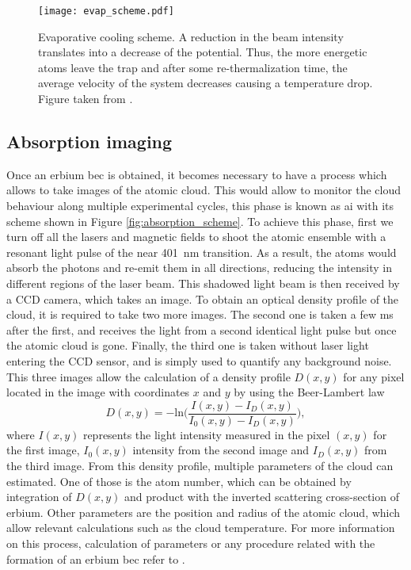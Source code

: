 \begin{figure}[!htbp]\centering
	\texttt{[image: evap\_scheme.pdf]}
	\caption[Evaporative cooling scheme]{Evaporative cooling scheme. A reduction in the beam intensity translates into a decrease of the potential. Thus, the more energetic atoms leave the trap and after some re-thermalization time, the average velocity of the system decreases causing a temperature drop. Figure taken from \cite{Rehberger2013}. }\label{fig:evaporative_cooling}
\end{figure}


\subsection{Absorption imaging}

Once an erbium \ac{bec} is obtained, it becomes necessary to have a process which allows to take images of the atomic cloud. This would allow to monitor the cloud behaviour along multiple experimental cycles, this phase is known as \Acf{ai} with its scheme shown in Figure \ref{fig:absorption_scheme}. To achieve this phase, first we turn off all the lasers and magnetic fields to shoot the atomic ensemble with a resonant light pulse of the near \SI{401}{\nano\meter} transition. As a result, the atoms would absorb the photons and re-emit them in all directions, reducing the intensity in different regions of the laser beam. This shadowed light beam is then received by a CCD camera, which takes an image. To obtain an optical density profile of the cloud, it is required to take two more images. The second one is taken a few \si{\milli\second} after the first, and receives the light from a second identical light pulse but once the atomic cloud is gone. Finally, the third one is taken without laser light entering the CCD sensor, and is simply used to quantify any background noise. This three images allow the calculation of a density profile $D(x,y)$ for any pixel located in the image with coordinates $x$ and $y$ by using the Beer-Lambert law \cite{Ulitzsch2016}
\begin{equation}
	D(x,y)=-\text{ln}\bigg(\frac{I(x,y)-I_{D}(x,y)}{I_0(x,y)-I_D(x,y)}\bigg),
\end{equation}
where $I(x,y)$ represents the light intensity measured in the pixel $(x,y)$ for the first image,  $I_0(x,y)$ intensity from the second image and $I_D(x,y)$ from the third image. From this density profile, multiple parameters of the cloud can estimated. One of those is the atom number, which can be obtained by integration of $D(x,y)$ and product with the inverted scattering cross-section of erbium. Other parameters are the position and radius of the atomic cloud, which allow relevant calculations such as the cloud temperature. For more information on this process, calculation of parameters or any procedure related with the formation of an erbium \ac{bec} refer to \cite{Ulitzsch2016, Roell2016}.


